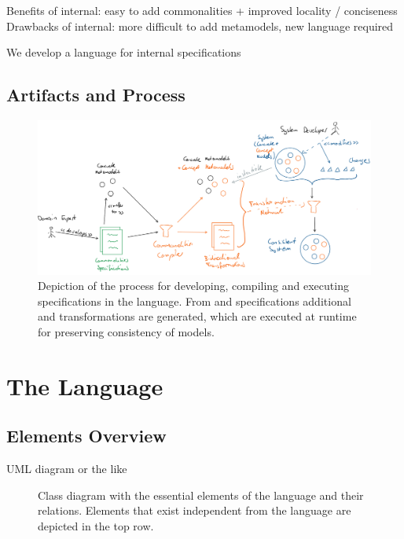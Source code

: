 Benefits of internal: easy to add commonalities + improved locality / conciseness
Drawbacks of internal: more difficult to add metamodels, new language required

We develop a language for internal specifications


\subsection{Artifacts and Process}

\begin{figure}
    \centering
    \includegraphics[width=\textwidth]{figures/quality/language/overall_process.png}
    \caption[Process and artifacts using the \commonalities language]{Depiction of the process for developing, compiling and executing specifications in the \commonalities language. From \concretemetamodels and \commonalities specifications additional \conceptmetamodels and transformations are generated, which are executed at runtime for preserving consistency of models.}
    \label{fig:language:process}
\end{figure}


\section{The \Commonalities Language}

\subsection{Elements Overview}
UML diagram or the like

\begin{figure}
    \centering
    
    \caption[\commonalities language elements]{Class diagram with the essential elements of the \commonalities language and their relations. Elements that exist independent from the language are depicted in the top row.}
    \label{fig:language:elements}
\end{figure}

